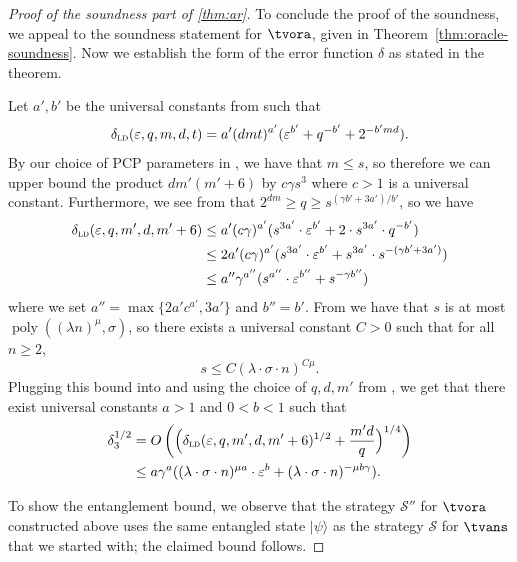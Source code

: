 \documentclass[11pt]{article}
\theoremstyle{definition}
\newcommand{\ket}[1]{|#1\rangle}
\newcommand{\ld}{\textsc{ld}}
\DeclareMathOperator{\poly}{poly}
\newcommand{\eps}{\varepsilon}
\newcommand{\strategy}{\mathscr{S}}
\begin{document}
\begin{proof}[Proof of the soundness part of \cref{thm:ar}]
	To conclude the proof of the soundness, we appeal to the soundness statement
  for $\tvora$, given in Theorem~\ref{thm:oracle-soundness}.
  Now we establish the form of the error function $\delta$ as stated in the
  theorem. 
  
  Let $a',b'$ be the universal constants from  such that
  \[
    \delta_\ld(\eps,q,m,d,t) = a' (dmt)^{a'} (\eps^{b'} + q^{-b'} + 2^{-b' m d}).
 	\]
	By our choice of PCP parameters in , we have that $m \leq
  s$, so therefore we can upper bound the product $dm'(m' + 6)$ by $c \gamma
  s^3$ where $c > 1$ is a universal constant.
  Furthermore, we see from  that $2^{dm} \geq q \geq s^{(\gamma
    b' + 3a')/b'}$, so we have
	\begin{align}
		\delta_\ld(\eps,q,m',d,m'+6)
    & \leq a' (c\gamma)^{a'} ( s^{3a'} \cdot \eps^{b'} +
      2 \cdot s^{3 a'} \cdot q^{-b'}) \notag \\
    & \leq 2 a' (c\gamma)^{a'} ( s^{3a'} \cdot \eps^{b'} + s^{3 a'}
      \cdot s^{-(\gamma b' + 3a')}) \notag \\
    & \leq a'' \gamma^{a''} ( s^{a''} \cdot \eps^{b''}
      + s^{-\gamma b''}) \label{eq:ar-sound-3}
	\end{align}
	where we set $a'' = \max \{ 2 a' c^{a'} , 3a'\}$ and $b'' = b'$.
From  we
  have that $s$ is at most $\poly( (\lambda n)^\mu , \sigma)$, so there exists a
  universal constant $C > 0$ such that for all $n \geq 2$,
  \[
  	s \leq C ( \lambda \cdot \sigma \cdot n)^{C \mu}.
  \]
  Plugging this bound into  and using the choice of $q,d,m'$
  from , we get that there exist universal constants $a > 1$
  and $0 < b < 1$ such that
  \begin{align*}
    \delta_3^{1/2}
    & = O \left ( \Big (\delta_\ld(\eps, q, m', d, m'+6)^{1/2} +
      \frac{m'd}{q} \Big)^{1/4} \right ) \\
    & \leq a \gamma^a ( (\lambda \cdot \sigma \cdot n)^{\mu a} \cdot \eps^{b}
      + (\lambda \cdot \sigma \cdot n)^{- \mu b \gamma}).
  \end{align*}  
  


  To show the entanglement bound, we observe that the strategy $\strategy''$ for
  $\tvora$ constructed above uses the same entangled state $\ket{\psi}$ as the
  strategy $\strategy$ for $\tvans$ that we started with; the claimed bound
  follows.
\end{proof}
\end{document}
